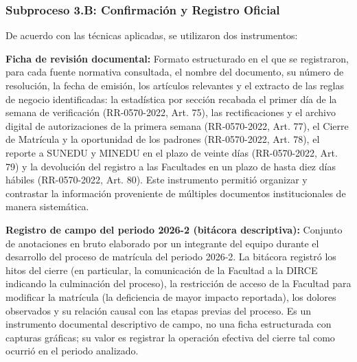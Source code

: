 \subsubsection{Subproceso 3.B: Confirmación y Registro Oficial}

De acuerdo con las técnicas aplicadas, se utilizaron dos instrumentos:

\textbf{Ficha de revisi\'on documental:} Formato estructurado en el que se registraron, para cada fuente normativa consultada, el nombre del documento, su n\'umero de resoluci\'on, la fecha de emisi\'on, los art\'iculos relevantes y el extracto de las reglas de negocio identificadas: la estad\'istica por secci\'on recabada el primer d\'ia de la semana de verificaci\'on (RR-0570-2022, Art. 75\textdegree{}), las rectificaciones y el archivo digital de autorizaciones de la primera semana (RR-0570-2022, Art. 77\textdegree{}), el Cierre de Matr\'icula y la oportunidad de los padrones (RR-0570-2022, Art. 78\textdegree{}), el reporte a SUNEDU y MINEDU en el plazo de veinte d\'ias (RR-0570-2022, Art. 79\textdegree{}) y la devoluci\'on del registro a las Facultades en un plazo de hasta diez d\'ias h\'abiles (RR-0570-2022, Art. 80\textdegree{}). Este instrumento permiti\'o organizar y contrastar la informaci\'on proveniente de m\'ultiples documentos institucionales de manera sistem\'atica.

\textbf{Registro de campo del periodo 2026-2 (bit\'acora descriptiva):} Conjunto de anotaciones en bruto elaborado por un integrante del equipo durante el desarrollo del proceso de matr\'icula del periodo 2026-2. La bit\'acora registr\'o los hitos del cierre (en particular, la comunicaci\'on de la Facultad a la DIRCE indicando la culminaci\'on del proceso), la restricci\'on de acceso de la Facultad para modificar la matr\'icula (la deficiencia de mayor impacto reportada), los dolores observados y su relaci\'on causal con las etapas previas del proceso. Es un instrumento documental descriptivo de campo, no una ficha estructurada con capturas gr\'aficas; su valor es registrar la operaci\'on efectiva del cierre tal como ocurri\'o en el periodo analizado.
